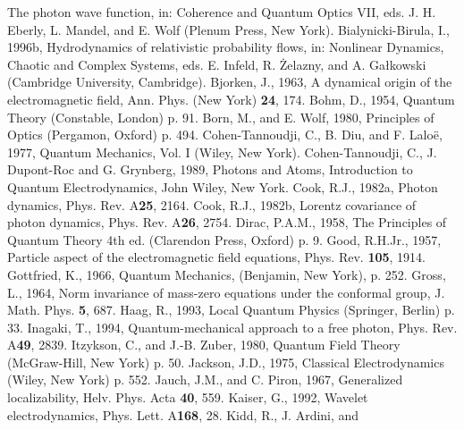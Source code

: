 \documentclass[11pt]{article}
\begin{document}
\begin{thebibliography}{References}
The photon wave function, in: Coherence and Quantum Optics VII, eds. J. H.
Eberly, L. Mandel, and E. Wolf (Plenum Press, New York).
 Bialynicki-Birula, I., 1996b,
Hydrodynamics of relativistic probability flows, in: Nonlinear Dynamics,
Chaotic and Complex Systems, eds. E. Infeld, R. {\.Z}elazny, and A.
Ga{\l}kowski (Cambridge University, Cambridge).
 Bjorken, J., 1963, A dynamical origin
of the electromagnetic field, Ann. Phys. (New York) {\bf 24}, 174.
 Bohm, D., 1954, Quantum Theory (Constable,
London) p. 91.
 Born, M., and E. Wolf, 1980,
Principles of Optics (Pergamon, Oxford) p. 494.
Cohen-Tannoudji, C., B. Diu, and F. Lalo\"e, 1977, Quantum Mechanics, Vol. I
(Wiley, New York).
Cohen-Tannoudji, C., J. Dupont-Roc and G. Grynberg, 1989, Photons and Atoms,
Introduction to Quantum Electrodynamics, John Wiley, New York.
 Cook, R.J., 1982a, Photon dynamics, Phys.
Rev. A{\bf 25}, 2164.
 Cook, R.J., 1982b, Lorentz covariance of
photon dynamics, Phys. Rev. A{\bf 26}, 2754.
 Dirac, P.A.M., 1958, The Principles of
Quantum Theory 4th ed. (Clarendon Press, Oxford) p. 9.
 Good, R.H.Jr., 1957, Particle aspect of the
electromagnetic field equations, Phys. Rev. {\bf 105}, 1914.
 Gottfried, K., 1966, Quantum
Mechanics, (Benjamin, New York), p. 252.
 Gross, L., 1964, Norm invariance of
mass-zero equations under the conformal group, J. Math. Phys. {\bf 5}, 687.
 Haag, R., 1993, Local Quantum Physics
(Springer, Berlin) p. 33.
 Inagaki, T., 1994, Quantum-mechanical
approach to a free photon, Phys. Rev. A{\bf 49}, 2839.
 Itzykson, C., and J.-B. Zuber,
1980, Quantum Field Theory (McGraw-Hill, New York) p. 50.
 Jackson, J.D., 1975, Classical
Electrodynamics (Wiley, New York) p. 552.
 Jauch, J.M., and C. Piron, 1967,
Generalized localizability, Helv. Phys. Acta {\bf 40}, 559.
 Kaiser, G., 1992, Wavelet electrodynamics, Phys. Lett. A{\bf 168}, 28.
 Kidd, R., J. Ardini, and

\end{thebibliography}
\end{document}
